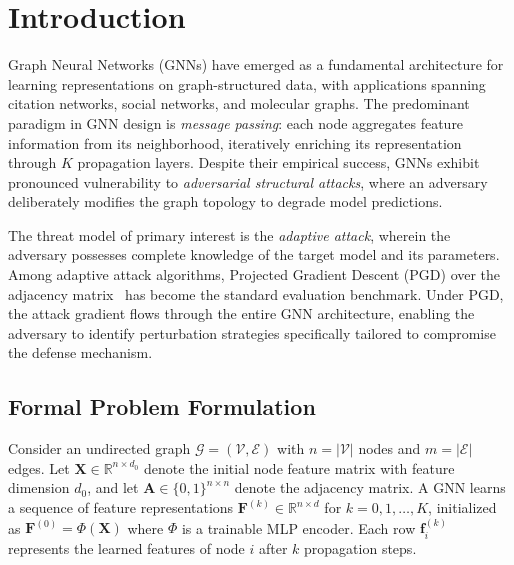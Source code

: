 \documentclass[sigconf]{acmart}
\begin{document}
\maketitle

\section{Introduction}

Graph Neural Networks (GNNs) have emerged as a fundamental architecture for learning representations on graph-structured data, with applications spanning citation networks, social networks, and molecular graphs. The predominant paradigm in GNN design is \emph{message passing}: each node aggregates feature information from its neighborhood, iteratively enriching its representation through $K$ propagation layers. Despite their empirical success, GNNs exhibit pronounced vulnerability to \emph{adversarial structural attacks}, where an adversary deliberately modifies the graph topology to degrade model predictions.

The threat model of primary interest is the \emph{adaptive attack}, wherein the adversary possesses complete knowledge of the target model and its parameters. Among adaptive attack algorithms, Projected Gradient Descent (PGD) over the adjacency matrix~\cite{xu2019pgd} has become the standard evaluation benchmark. Under PGD, the attack gradient flows through the entire GNN architecture, enabling the adversary to identify perturbation strategies specifically tailored to compromise the defense mechanism.

\subsection{Formal Problem Formulation}

Consider an undirected graph $\mathcal{G} = (\mathcal{V}, \mathcal{E})$ with $n = |\mathcal{V}|$ nodes and $m = |\mathcal{E}|$ edges. Let $\mathbf{X} \in \mathbb{R}^{n \times d_0}$ denote the initial node feature matrix with feature dimension $d_0$, and let $\mathbf{A} \in \{0,1\}^{n \times n}$ denote the adjacency matrix. A GNN learns a sequence of feature representations $\mathbf{F}^{(k)} \in \mathbb{R}^{n \times d}$ for $k = 0, 1, \ldots, K$, initialized as $\mathbf{F}^{(0)} = \Phi(\mathbf{X})$ where $\Phi$ is a trainable MLP encoder. Each row $\mathbf{f}_i^{(k)}$ represents the learned features of node $i$ after $k$ propagation steps.
\end{document}
